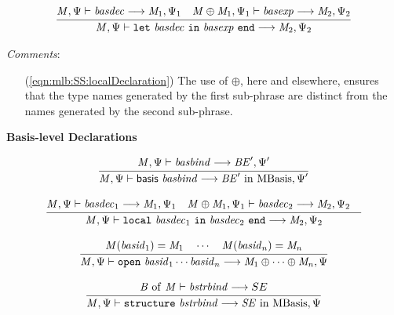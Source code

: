 \documentclass[draft]{article}
\renewcommand{\mit}[1]{\mathit{#1}}
\newcommand{\mrm}[1]{\mathrm{#1}}
\newcommand{\mtt}[1]{\mathtt{#1}}
\newcommand{\msf}[1]{\mathsf{#1}}
\newcommand{\infrule}[2]{{\frac{\displaystyle\strut{#1}}{\displaystyle\strut{#2}}}}
\newcommand{\judge}[2]{\infrule{#1}{#2}}
\begin{document}
\begin{equation}
\label{eqn:mlb:SS:localDeclaration}
\judge{
\mit{M}, \Psi \vdash \mit{basdec} \longrightarrow \mit{M}_1, \Psi_1 \quad
\mit{M} \oplus \mit{M}_1, \Psi_1 \vdash \mit{basexp} \longrightarrow \mit{M}_2, \Psi_2
}{
\mit{M}, \Psi \vdash \mtt{let}~ \mit{basdec} ~\mtt{in}~ \mit{basexp} ~\mtt{end} \longrightarrow \mit{M}_2, \Psi_2
}
\end{equation}

\begin{samepage}
\noindent
\textit{Comments}:
\begin{itemize}
\item[(\ref{eqn:mlb:SS:localDeclaration})] The use of $\oplus$, here
  and elsewhere, ensures that the type names generated by the first
  sub-phrase are distinct from the names generated by the second sub-phrase.
\end{itemize}
\end{samepage}

\vspace{2\parsep}
{\large\noindent
\textbf{Basis-level Declarations} \hfill 
\fbox{$\mit{M}, \Psi \vdash \mit{basdec} \longrightarrow \mit{M}', \Psi'$}
}\nopagebreak

\begin{equation}
\judge{
\mit{M}, \Psi  \vdash \mit{basbind} \longrightarrow \mit{BE}', \Psi'
}{
\mit{M}, \Psi  \vdash \msf{basis}~ \mit{basbind} \longrightarrow \mit{BE}' ~\mrm{in}~ \mrm{MBasis}, \Psi'
}
\end{equation}

\begin{equation}
\judge{
\mit{M}, \Psi  \vdash \mit{basdec}_1 \longrightarrow \mit{M}_1, \Psi_1 \quad
\mit{M} \oplus \mit{M}_1, \Psi_1  \vdash \mit{basdec}_2 \longrightarrow \mit{M}_2, \Psi_2 \quad
}{
\mit{M}, \Psi  \vdash \mtt{local}~ \mit{basdec}_1 ~\mtt{in}~ \mit{basdec}_2 ~\mtt{end} \longrightarrow \mit{M}_2, \Psi_2
}
\end{equation}

\begin{equation}
\judge{
\mit{M}(\mit{basid}_1) = \mit{M}_1 \quad \cdots \quad
\mit{M}(\mit{basid}_n) = \mit{M}_n 
}{
\mit{M}, \Psi  \vdash \mtt{open}~ \mit{basid}_1 \cdots \mit{basid}_n \longrightarrow \mit{M}_1 \oplus \cdots \oplus \mit{M}_n, \Psi
}
\end{equation}

\begin{equation}
\judge{
\mit{B}~\mrm{of}~\mit{M} \vdash \mit{bstrbind} \longrightarrow SE
}{
\mit{M}, \Psi  \vdash \mtt{structure}~ \mit{bstrbind}
\longrightarrow \mit{SE} ~\mrm{in}~ \mrm{MBasis}, \Psi
}
\end{equation}
\end{document}
